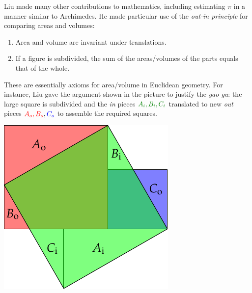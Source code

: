 \begin{minipage}[t]{0.64\linewidth}\vspace{0pt}

Liu made many other contributions to mathematics, including estimating $\pi$ in a manner similar to Archimedes. He made particular use of the \emph{out-in principle} for comparing areas and volumes:

\begin{enumerate}%
  \item Area and volume are invariant under translations.
  \item If a figure is subdivided, the sum of the areas/volumes of the parts equals that of the whole.
\end{enumerate}
These are essentially axioms for area/volume in Euclidean geometry. For instance, Liu gave the argument shown in the picture to justify the \emph{gao gu}: the large square is subdivided and the \emph{in} pieces $\textcolor{Green}{A_i,B_i,C_i}$ translated to new \emph{out} pieces $\textcolor{red}{A_o,B_o},\textcolor{blue}{C_o}$ to assemble the required squares.
\end{minipage}\hfill\begin{minipage}[t]{0.33\linewidth}\vspace{0pt}
\flushright\includegraphics[scale=0.95]{outin}
\end{minipage}\medbreak

